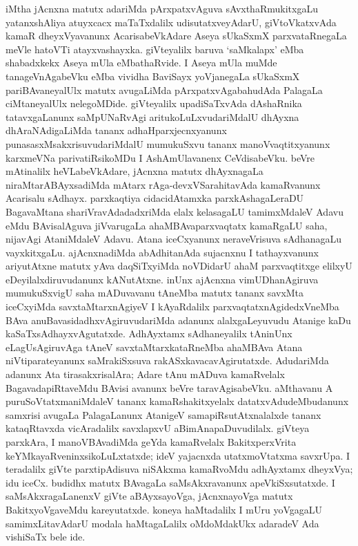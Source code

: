 iMtha jAcnxna matutx adariMda pArxpatxvAguva sAvxthaRmukitxgaLu yatanxshAliya atuyxcacx maTaTxdalilx udisutatxveyAdarU, giVtoVkatxvAda kamaR dheyxVyavanunx Acarisa\-beVkAdare Aseya sUkaSxmX parxvataRnegaLa meVle hatoVTi atayxvashayxka. giVteyalilx baruva `saMkalapx' eMba shabadxkekx Aseya mUla eMbathaRvide. I Aseya mUla muMde tanageV\-nAgabeVku eMba vividha BaviSayx yoVjanegaLa sUkaSxmX pariBAvaneyalUlx matutx avugaLiMda pArxpatxvAgabahudAda PalagaLa ciMtaneyalUlx nelegoMDide. giVteyalilx upadiSaTxvAda dAshaRnika tatavxgaLanunx saMpUNaRvAgi aritukoLuLxvudariMdalU dhAyxna dhAraNAdigaLiMda tananx adhaHparxjecnxyanunx punasasxMsakxrisuvudariMdalU mumukuSxvu tananx manoVvaqtitxyanunx karxmeVNa parivatiRsikoMDu I AshAmUlavanenx CeVdisabeVku. beVre mAtinalilx heVLabeVkAdare, jAcnxna matutx dhAyxnagaLa niraMtarABAyxsadiMda mAtarx rAga-devxVSarahitavAda kamaRvanunx Acarisalu sAdhayx. parxkaqtiya cidacidAtamxka parxkAsha\-gaLeraDU BagavaMtana shariVravAdadadxriMda elalx kelasagaLU tamimxMdaleV Adavu eMdu BAvisalAguva jiVvarugaLa ahaMBAvaparxvaqtatx kamaRgaLU saha, nijavAgi Ata\-niMdaleV Adavu. Atana iceCxyanunx neraveVrisuva sAdhanagaLu vayxkitxgaLu. ajAcnxnadiMda abAdhitanAda sujacnxnu I tathayxvanunx ariyutAtxne matutx yAva daqSiTxyiMda noVDidarU ahaM parxvaqtitxge elilxyU eDeyilalxdiruvudanunx kANutAtxne. inUnx  ajAcnxna vimUDhanAgiruva mumukuSxvigU saha mADuvavanu tAneMba matutx tananx savxMta iceCxyiMda savxtaMtarxnAgiyeV I kAyaRdalilx parxvaqtatxnAgidedxVneMba BAva anuBava\-sidadhxvAgiruvudariMda adanunx alalxgaLeyuvudu Atanige kaDu kaSaTxsAdhayxvAgutatxde. AdhAyxtamx sAdhaneyalilx tAninUnx eLagUsAgiruvAga tAneV savxtaMtarxkataRneMba ahaMBAva Atana niVtiparateyanunx saMrakiSxsuva rakASxkavacavAgirutatxde. AdudariMda adanunx Ata tirasakxrisalAra; Adare tAnu mADuva kamaRvelalx BagavadapiRtaveMdu BAvisi avanunx beVre taravAgisabeVku. aMthavanu A puruSoVtatxmaniMdaleV tananx kamaRshakitxyelalx datatxvAdudeMbudanunx samxrisi avugaLa PalagaLanunx AtanigeV samapiRsutAtxnalalxde tananx kataqRtavxda vicAradalilx savxlapxvU aBimAnapaDuvudilalx. giVteya parxkAra, I manoVBAvadiMda geYda kamaRvelalx BakitxperxVrita keYMkayaRveninxsikoLuLx\-tatxde; ideV yajacnxda utatxmoVtatxma savxrUpa. I teradalilx giVte parxtipAdisuva niSAkxma kamaR\-voMdu adhAyxtamx dheyxVya; idu iceCx. budidhx matutx BAvagaLa saMsAkxravanunx apeVkiSx\-sutatxde. I saMsAkxragaLanenxV giVte aBAyxsa\-yoVga, jAcnxnayoVga matutx BakitxyoVgaveMdu kareyutatxde. koneya haMtadalilx I mUru yoVgagaLU samimxLitavAdarU modala haMtagaLalilx oMdoMdakUkx adaradeV Ada vishiSaTx bele ide.


